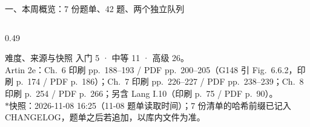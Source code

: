 \documentclass[aspectratio=169,10pt,fontset=none]{ctexbeamer}
\newcommand{\starpt}{\textcolor{accent}{\bfseries$\ast$}}
\begin{document}
\begin{frame}[t]{一、本周概览：7 份题单、42 题、两个独立队列}
\begin{columns}[T,onlytextwidth]
\begin{column}{0.49\textwidth}
      \begin{block}{\footnotesize 难度、来源与快照}
        \scriptsize
        入门 5 · 中等 11 · 高级 26。\\
        Artin 2e：Ch.~6 印刷 pp.~188--193 / PDF pp.~200--205（G148 引 Fig.~6.6.2，印刷 p.~174 / PDF p.~186）；Ch.~7 印刷 pp.~226--227 / PDF pp.~238--239；Ch.~8 印刷 p.~254 / PDF p.~266；另含 Lang I.10（印刷 p.~75 / PDF p.~90）。\\[1pt]
        \starpt 快照：2026-11-08 16:25（11-08 题单读取时间）；7 份清单的哈希前缀已记入 CHANGELOG，题单之后若追加，以库内文件为准。
      \end{block}
    \end{column}
  \end{columns}
\end{frame}

\end{document}
